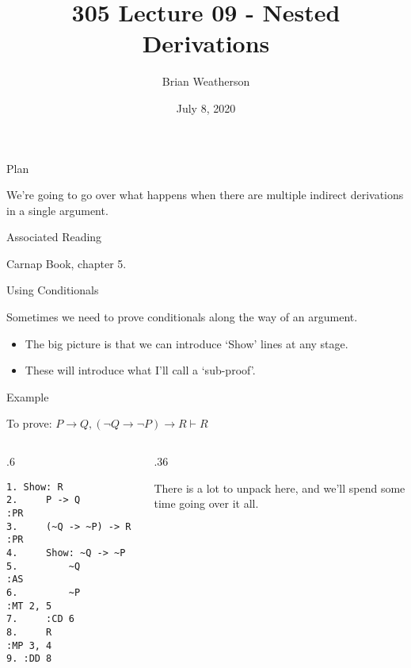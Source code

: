 \documentclass[
  ignorenonframetext,
]{beamer}
\title{305 Lecture 09 - Nested Derivations}
\author{Brian Weatherson}
\date{July 8, 2020}
\providecommand{\tightlist}{%
  \setlength{\itemsep}{0pt}\setlength{\parskip}{0pt}}
\renewcommand{\,}{\text{, }}
\def\begincols{\begin{columns}}
\def\begincol{\begin{column}}
\def\endcol{\end{column}}
\def\endcols{\end{columns}}
\begin{document}
\frame{\titlepage}

\begin{frame}{Plan}
\protect\hypertarget{plan}{}

We're going to go over what happens when there are multiple indirect
derivations in a single argument.

\end{frame}

\begin{frame}{Associated Reading}
\protect\hypertarget{associated-reading}{}

Carnap Book, chapter 5.

\end{frame}

\begin{frame}{Using Conditionals}
\protect\hypertarget{using-conditionals}{}

Sometimes we need to prove conditionals along the way of an argument.

\begin{itemize}
\tightlist
\item
  The big picture is that we can introduce `Show' lines at any stage.
\item
  These will introduce what I'll call a `sub-proof'.
\end{itemize}

\end{frame}

\begin{frame}[fragile]{Example}
\protect\hypertarget{example}{}

To prove:
\(P \rightarrow Q, (\neg Q \rightarrow \neg P) \rightarrow R \vdash R\)

\bigskip

\begincols
\begincol{.6\textwidth}

\begin{verbatim}
1. Show: R
2.     P -> Q            :PR
3.     (~Q -> ~P) -> R   :PR
4.     Show: ~Q -> ~P
5.         ~Q            :AS
6.         ~P            :MT 2, 5
7.     :CD 6
8.     R                 :MP 3, 4
9. :DD 8
\end{verbatim}

\endcol
\begincol{.36\textwidth}

There is a lot to unpack here, and we'll spend some time going over it
all.

\endcol
\endcols

\end{frame}
\end{document}
